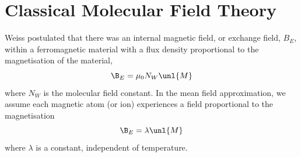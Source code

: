 \documentclass[a4paper, 11pt, normalem]{report}
\begin{document}
\section{Classical Molecular Field Theory}

Weiss postulated that there was an internal magnetic field, or exchange field, $B_E$, within a ferromagnetic material with a flux density proportional to the magnetisation of the material, 
\begin{equation}
    \B_E = \mu_0N_W\unl{M}
\end{equation}
where $N_W$ is the molecular field constant. 
In the mean field approximation, we assume each magnetic atom (or ion) experiences a field proportional to the magnetisation
\begin{equation}
    \B_E = \lambda\unl{M}
\end{equation}
where $\lambda$ is a constant, independent of temperature.
\end{document}
